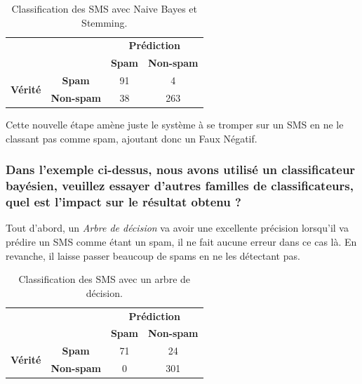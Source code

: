 \documentclass[a4paper]{article}
\begin{document}
\begin{table}[H]
	\centering
	\def\arraystretch{2.0}
	\begin{tabular}{cccl}
															  & \textbf{}                              & \multicolumn{2}{c}{\textbf{Prédiction}}                                          \\ \cline{3-4} 
															  & \multicolumn{1}{c|}{}                  & \multicolumn{1}{c|}{\textbf{Spam}}      & \multicolumn{1}{c|}{\textbf{Non-spam}} \\ \cline{2-4} 
		\multicolumn{1}{c|}{\multirow{2}{*}{\textbf{Vérité}}} & \multicolumn{1}{c|}{\textbf{Spam}}     & \multicolumn{1}{c|}{91}                 & \multicolumn{1}{c|}{4}                 \\ \cline{2-4} 
		\multicolumn{1}{c|}{}                                 & \multicolumn{1}{c|}{\textbf{Non-spam}} & \multicolumn{1}{c|}{38}                 & \multicolumn{1}{c|}{263}               \\ \cline{2-4} 
	\end{tabular}
	\caption{Classification des SMS avec Naive Bayes et Stemming.}
\end{table}

Cette nouvelle étape amène juste le système à se tromper sur un SMS en ne le classant pas comme spam, ajoutant donc un Faux Négatif.

\subsubsection*{Dans l'exemple ci-dessus, nous avons utilisé un classificateur bayésien, veuillez essayer d'autres familles de classificateurs, quel est l'impact sur le résultat obtenu ?}

Tout d'abord, un \textit{Arbre de décision} va avoir une excellente précision lorsqu'il va prédire un SMS comme étant un spam, il ne fait aucune erreur dans ce cas là.
En revanche, il laisse passer beaucoup de spams en ne les détectant pas.

\begin{table}[H]
	\centering
	\def\arraystretch{2.0}
	\begin{tabular}{cccl}
															  & \textbf{}                              & \multicolumn{2}{c}{\textbf{Prédiction}}                                          \\ \cline{3-4} 
															  & \multicolumn{1}{c|}{}                  & \multicolumn{1}{c|}{\textbf{Spam}}      & \multicolumn{1}{c|}{\textbf{Non-spam}} \\ \cline{2-4} 
		\multicolumn{1}{c|}{\multirow{2}{*}{\textbf{Vérité}}} & \multicolumn{1}{c|}{\textbf{Spam}}     & \multicolumn{1}{c|}{71}                 & \multicolumn{1}{c|}{24}                \\ \cline{2-4} 
		\multicolumn{1}{c|}{}                                 & \multicolumn{1}{c|}{\textbf{Non-spam}} & \multicolumn{1}{c|}{0}                  & \multicolumn{1}{c|}{301}               \\ \cline{2-4} 
	\end{tabular}
	\caption{Classification des SMS avec un arbre de décision.}
\end{table}
\end{document}
